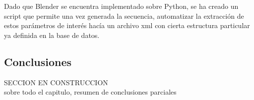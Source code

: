 Dado que Blender se encuentra implementado sobre Python, se ha creado un script que permite una vez generada la secuencia, automatizar la extracción de estos parámetros de interés hacía un archivo xml con cierta estructura particular ya definida en la base de datos. 
 


\subsection{Conclusiones} SECCION EN CONSTRUCCION\\
sobre todo el capitulo, resumen de conclusiones parciales



